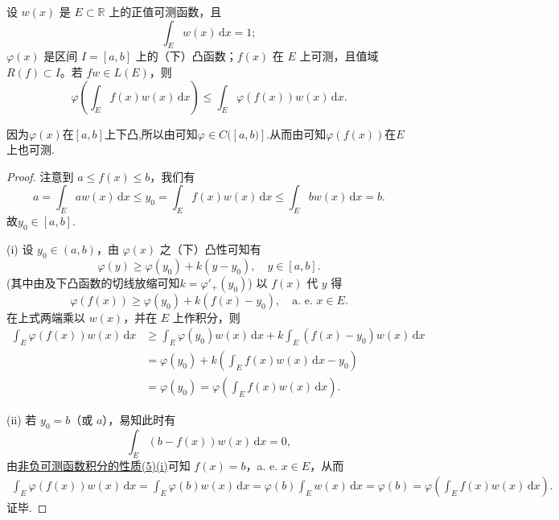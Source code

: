 \documentclass[../../main.tex]{subfiles}%
\begin{document}
\begin{theorem}[Jensen不等式]\label{theorem:Jensen不等式}
设 $w(x)$ 是 $E \subset \mathbb{R}$ 上的正值可测函数，且
\[
\int_E w(x) \, \mathrm{d}x = 1;
\]
$\varphi(x)$ 是区间 $I = [a,b]$ 上的（下）凸函数；$f(x)$ 在 $E$ 上可测，且值域 $R(f) \subset I$。若 $fw \in L(E)$，则
\[
\varphi\left( \int_E f(x)w(x) \, \mathrm{d}x \right) \leqslant \int_E \varphi(f(x))w(x) \, \mathrm{d}x.
\]
\end{theorem}
\begin{remark}
因为$\varphi(x)$在$[a,b]$上下凸,所以由可知$\varphi \in C([a,b)]$.从而由可知$\varphi(f(x))$在$E$上也可测.
\end{remark}
\begin{proof}

注意到 $a \leqslant f(x) \leqslant b$，我们有
\[
a=\int_E{aw(x)\,\mathrm{d}x}\leqslant y_0=\int_E{f(x)w(x)\,\mathrm{d}x}\leqslant \int_E{bw(x)\,\mathrm{d}x}=b.
\]
故$y_0\in[a,b]$.

(i) 设 $y_0 \in (a,b)$，由 $\varphi(x)$ 之（下）凸性可知有
\[
\varphi(y) \geqslant \varphi(y_0) + k(y - y_0), \quad y \in [a,b].
\]
(其中由及下凸函数的切线放缩可知$k=\varphi'_+(y_0)$)
以 $f(x)$ 代 $y$ 得
\[
\varphi(f(x)) \geqslant \varphi(y_0) + k(f(x) - y_0), \quad \text{a. e. } x \in E.
\]
在上式两端乘以 $w(x)$，并在 $E$ 上作积分，则
\begin{align*}
\int_E \varphi(f(x))w(x) \, \mathrm{d}x &\geqslant \int_E \varphi(y_0)w(x) \, \mathrm{d}x + k \int_E (f(x) - y_0)w(x) \, \mathrm{d}x \\
&= \varphi(y_0) + k \left( \int_E f(x)w(x) \, \mathrm{d}x - y_0 \right) \\
&= \varphi(y_0) = \varphi\left( \int_E f(x)w(x) \, \mathrm{d}x \right).
\end{align*}

(ii) 若 $y_0 = b$（或 $a$），易知此时有
\[
\int_E (b - f(x))w(x) \, \mathrm{d}x = 0,
\]
由\hyperref[theorem:非负可测函数积分的性质]{非负可测函数积分的性质(5)(i)}可知 $f(x) = b$，a. e. $x \in E$，从而
\begin{align*}
\int_E \varphi(f(x))w(x) \, \mathrm{d}x = \int_E \varphi(b)w(x) \, \mathrm{d}x 
= \varphi(b) \int_E w(x) \, \mathrm{d}x = \varphi(b) 
= \varphi\left( \int_E f(x)w(x) \, \mathrm{d}x \right).
\end{align*}
证毕.

\end{proof}
\end{document}
